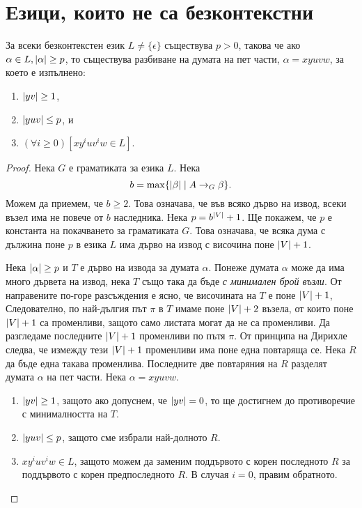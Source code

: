 \section{Езици, които не са безконтекстни}

\begin{lemma}
  \label{lem:pumping-context} 
  За всеки безконтекстен език $L\neq\{\epsilon\}$ съществува $p>0$, такова
  че ако $\alpha\in L, \lvert{\alpha}\rvert \geq p$, то съществува разбиване на думата на пет части, $\alpha=xyuvw$,
  за което е изпълнено:
  \begin{enumerate}[1)]
  \item
    $\lvert{yv}\rvert\geq 1$,
  \item
    $\lvert{yuv}\rvert\leq p$, и
  \item
    $(\forall i\geq 0)[xy^iuv^iw\in L]$.
\end{enumerate}
\end{lemma}
\begin{proof}
  Нека $G$ е граматиката за езика $L$.
  Нека \[b = \max\{\lvert{\beta}\rvert \mid A\rightarrow_G \beta\}.\]
  Можем да приемем, че $b \geq 2$.
  Това означава, че във всяко дърво на извод, всеки възел има
  не повече от $b$ наследника.
  Нека $p = b^{\lvert{V}\rvert}+1$. Ще покажем, че $p$ е константа на покачването за граматиката $G$.
  Това означава, че всяка дума с дължина поне $p$ в езика $L$ има дърво на извод с височина
  поне $\lvert{V}\rvert + 1$.
  
  Нека $\lvert{\alpha}\rvert \geq p$ и $T$ е дърво на извода за думата $\alpha$.
  Понеже думата $\alpha$ може да има много дървета на извод, нека $T$ също така да бъде {\em с минимален брой възли}. 
  От направените по-горе разсъждения е ясно, че височината на $T$ е поне $\lvert{V}\rvert + 1$,
  Следователно, по най-дългия път $\pi$ в $T$ имаме поне $\lvert{V}\rvert+2$ възела, от които
  поне $\lvert{V}\rvert+1$ са променливи, защото само листата могат да не са променливи.
  Да разгледаме последните $\lvert{V}\rvert+1$ променливи по пътя $\pi$.
  От принципа на Дирихле следва, че измежду тези $\lvert{V}\rvert+1$ променливи има поне една повтаряща се.
  Нека $R$ да бъде една такава променлива.
  Последните две повтаряния на $R$ разделят думата $\alpha$ на пет части.
  Нека $\alpha = xyuvw$.
  \begin{enumerate}[1)]
  \item
    $\lvert{yv}\rvert\geq 1$,
    защото ако допуснем, че $\lvert{yv}\rvert = 0$,
    то ще достигнем до противоречие с минималността на $T$.
  \item
    $\lvert{yuv}\rvert \leq p$, защото сме избрали най-долното $R$.
  \item
    $xy^iuv^iw \in L$, защото можем да заменим поддървото 
    с корен последното $R$ за поддървото с корен предпоследното $R$.
    В случая $i = 0$, правим обратното.
  \end{enumerate}
\end{proof}

